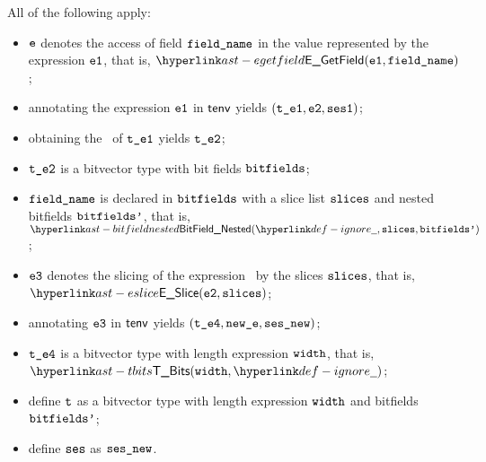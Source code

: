\ProseParagraph
All of the following apply:
\begin{itemize}
  \item $\ve$ denotes the access of field $\fieldname$ in the value represented by the expression $\veone$, that is, $\EGetField(\veone, \fieldname)$;
  \item annotating the expression $\veone$ in $\tenv$ yields $(\vteone, \vetwo, \vsesone)$\ProseOrTypeError;
  \item obtaining the \underlyingtype\ of $\vteone$ yields $\vtetwo$\ProseOrTypeError;
  \item $\vtetwo$ is a bitvector type with bit fields $\bitfields$;
  \item $\fieldname$ is declared in $\bitfields$ with a slice list $\slices$ and nested bitfields $\bitfieldsp$, that is,
        $\BitFieldNested(\Ignore, \slices, \bitfieldsp)$;
  \item $\vethree$ denotes the slicing of the expression \vetwo\ by the slices $\slices$, that is, \\ $\ESlice(\vetwo, \slices)$;
  \item annotating $\vethree$ in $\tenv$ yields $(\vtefour, \newe, \vsesnew)$\ProseOrTypeError;
  \item $\vtefour$ is a bitvector type with length expression $\width$, that is, $\TBits(\width, \Ignore)$;
  \item define $\vt$ as a bitvector type with length expression $\width$ and bitfields $\bitfieldsp$;
  \item define $\vses$ as $\vsesnew$.
\end{itemize}
\FormallyParagraph
\begin{mathpar}
\end{mathpar}

